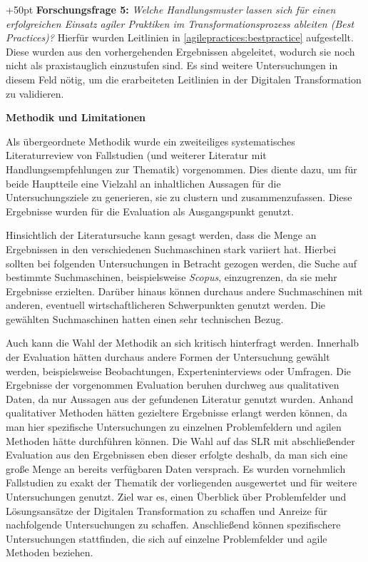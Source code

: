 \hangindent+50pt 
\textbf{Forschungsfrage 5:} \textit{Welche Handlungsmuster lassen sich für einen erfolgreichen Einsatz agiler Praktiken im Transformationsprozess ableiten (Best Practices)?}  Hierfür wurden Leitlinien in \ref{agilepractices:bestpractice} aufgestellt. Diese wurden aus den vorhergehenden Ergebnissen abgeleitet, wodurch sie noch nicht als praxistauglich einzustufen sind. Es sind weitere Untersuchungen in diesem Feld nötig, um die erarbeiteten Leitlinien in der Digitalen Transformation zu validieren.

\textbf{Methodik und Limitationen} 

Als übergeordnete Methodik wurde ein zweiteiliges systematisches Literaturreview von Fallstudien (und weiterer Literatur mit Handlungsempfehlungen zur Thematik) vorgenommen. Dies diente dazu, um für beide Hauptteile eine Vielzahl an inhaltlichen Aussagen für die Untersuchungsziele zu generieren, sie zu clustern und zusammenzufassen. Diese Ergebnisse wurden für die Evaluation als Ausgangspunkt genutzt. 

Hinsichtlich der Literatursuche kann gesagt werden, dass die Menge an Ergebnissen in den verschiedenen Suchmaschinen stark variiert hat. Hierbei sollten bei folgenden Untersuchungen in Betracht gezogen werden, die Suche auf bestimmte Suchmaschinen, beispielsweise \textit{Scopus}, einzugrenzen, da sie mehr Ergebnisse erzielten. Darüber hinaus können durchaus andere Suchmaschinen mit anderen, eventuell wirtschaftlicheren Schwerpunkten genutzt werden. Die gewählten Suchmaschinen hatten einen sehr technischen Bezug.

Auch kann die Wahl der Methodik an sich kritisch hinterfragt werden. Innerhalb der Evaluation hätten durchaus andere Formen der Untersuchung gewählt werden, beispielsweise Beobachtungen, Experteninterviews oder Umfragen. Die Ergebnisse der vorgenommen Evaluation beruhen durchweg aus qualitativen Daten, da nur Aussagen aus der gefundenen Literatur genutzt wurden. Anhand qualitativer Methoden hätten gezieltere Ergebnisse erlangt werden können, da man hier spezifische Untersuchungen zu einzelnen Problemfeldern und agilen Methoden hätte durchführen können. Die Wahl auf das SLR mit abschließender Evaluation aus den Ergebnissen eben dieser erfolgte deshalb, da man sich eine große Menge an bereits verfügbaren Daten versprach. Es wurden vornehmlich Fallstudien zu exakt der Thematik der vorliegenden ausgewertet und für weitere Untersuchungen genutzt. Ziel war es, einen Überblick über Problemfelder und Lösungsansätze der Digitalen Transformation zu schaffen und Anreize für nachfolgende Untersuchungen zu schaffen. Anschließend können spezifischere Untersuchungen stattfinden, die sich auf einzelne Problemfelder und agile Methoden beziehen. 

